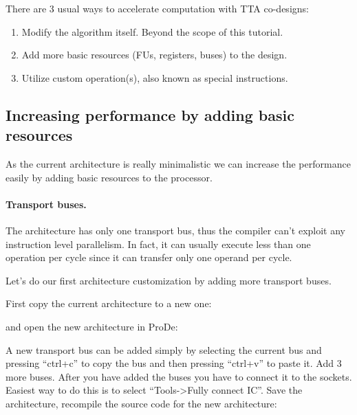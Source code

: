 \documentclass[a4paper,twoside]{tceusermanual}
\begin{document}
There are 3 usual ways to accelerate computation with TTA co-designs:

\begin{enumerate}
\item Modify the algorithm itself. Beyond the scope of this tutorial.
\item Add more basic resources (FUs, registers, buses) to the design.
\item Utilize custom operation(s), also known as special instructions.
\end{enumerate}

\subsection{Increasing performance by adding basic resources}
\label{ssec:large}

As the current architecture is really minimalistic we can increase the
performance easily by adding basic resources to the processor.

\paragraph{Transport buses.}

The architecture has only one transport bus, thus the compiler can't exploit
any instruction level parallelism. In fact, it can usually execute less than
one operation per cycle since it can transfer only one operand per cycle.

Let's do our first architecture customization by adding more transport buses.

First copy the current architecture to a new one:


and open the new architecture in ProDe:


A new transport bus can be added simply by selecting the current bus and
pressing ``ctrl+c'' to copy the bus and then pressing ``ctrl+v'' to paste it.
Add 3 more buses. After you have added the buses you have to connect it to the
sockets. Easiest way to do this is to select ``Tools->Fully connect IC''.
Save the architecture, recompile the source code for the new architecture:

\end{document}
